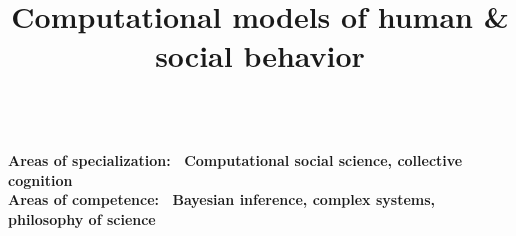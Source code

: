 \documentclass[10pt,a4paper,dvipsnames]{moderncv}
\title{Computational models of human \& social behavior}
\begin{document}
\hypersetup{
colorlinks=true,
linkcolor=DarkGreen,
urlcolor=DarkGreen,
,citecolor=Green
,citebordercolor=Green
,urlbordercolor=Green
}


\newcommand{\cvdoublecolumn}[2]{%
  \cvitem[0.75em]{}{%
    \begin{minipage}[t]{\listdoubleitemcolumnwidth}#1\end{minipage}%
    \hfill%
    \begin{minipage}[t]{\listdoubleitemcolumnwidth}#2\end{minipage}%
    }%
}

\newcommand{\cvreference}[8]{%
    \textbf{#1}\newline%
    \ifthenelse{\equal{#2}{}}{}{\addresssymbol~#2\newline}%
    \ifthenelse{\equal{#3}{}}{}{#3\newline}%
    \ifthenelse{\equal{#4}{}}{}{#4\newline}%
    \ifthenelse{\equal{#5}{}}{}{#5\newline}%
    \ifthenelse{\equal{#6}{}}{}{\emailsymbol~\texttt{#6}\newline}%
    \ifthenelse{\equal{#7}{}}{}{\phonesymbol~#7\newline}%
    \ifthenelse{\equal{#8}{}}{}{\homepagesymbol~#8}}


\maketitle

\vspace{-4em}
~\\
\textbf{\textcolor{moderncvgreen}{Areas of specialization:} \ Computational social science, collective cognition} \\
\textbf{\textcolor{moderncvgreen}{Areas of competence:} \ Bayesian inference, complex systems, philosophy of science}

\vspace{0em}
\end{document}
